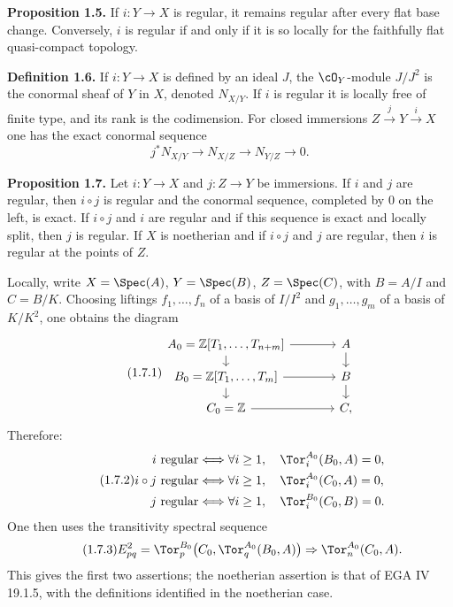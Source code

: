 \textbf{Proposition 1.5.} If \(i:Y\to X\) is regular, it remains regular after every flat base change. Conversely, \(i\) is regular if and only if it is so locally for the faithfully flat quasi-compact topology.

\textbf{Definition 1.6.} If \(i:Y\to X\) is defined by an ideal \(J\), the \(\cO_Y\)-module \(J/J^2\) is the conormal sheaf of \(Y\) in \(X\), denoted \(N_{X/Y}\). If \(i\) is regular it is locally free of finite type, and its rank is the codimension. For closed immersions \(Z\xrightarrow{j}Y\xrightarrow{i}X\) one has the exact conormal sequence
\begin{equation}\tag{1.6.1}
 j^*N_{X/Y}\longrightarrow N_{X/Z}\longrightarrow N_{Y/Z}\longrightarrow0.
\end{equation}

\textbf{Proposition 1.7.} Let \(i:Y\to X\) and \(j:Z\to Y\) be immersions. If \(i\) and \(j\) are regular, then \(i\circ j\) is regular and the conormal sequence, completed by \(0\) on the left, is exact. If \(i\circ j\) and \(i\) are regular and if this sequence is exact and locally split, then \(j\) is regular. If \(X\) is noetherian and if \(i\circ j\) and \(j\) are regular, then \(i\) is regular at the points of \(Z\).

Locally, write \(X=\Spec(A)\), \(Y=\Spec(B)\), \(Z=\Spec(C)\), with \(B=A/I\) and \(C=B/K\). Choosing liftings \(f_1,\ldots,f_n\) of a basis of \(I/I^2\) and \(g_1,\ldots,g_m\) of a basis of \(K/K^2\), one obtains the diagram
\begin{equation}\tag{1.7.1}
\begin{tikzcd}[column sep=large,row sep=small]
A_0=\mathbb Z[T_1,\ldots,T_{n+m}] \arrow[r] \arrow[d] & A \arrow[d]\\
B_0=\mathbb Z[T_1,\ldots,T_m] \arrow[r] \arrow[d] & B \arrow[d]\\
C_0=\mathbb Z \arrow[r] & C,
\end{tikzcd}
\end{equation}
Therefore:
\begin{equation}\tag{1.7.2}
\begin{aligned}
 i\ \text{regular} &\Longleftrightarrow \forall i\ge1,\quad
 \Tor_i^{A_0}(B_0,A)=0,\\
 i\circ j\ \text{regular} &\Longleftrightarrow \forall i\ge1,\quad
 \Tor_i^{A_0}(C_0,A)=0,\\
 j\ \text{regular} &\Longleftrightarrow \forall i\ge1,\quad
 \Tor_i^{B_0}(C_0,B)=0.
\end{aligned}
\end{equation}
One then uses the transitivity spectral sequence
\begin{equation}\tag{1.7.3}
E^2_{pq}=\Tor_p^{B_0}\bigl(C_0,\Tor_q^{A_0}(B_0,A)\bigr)\Rightarrow\Tor_n^{A_0}(C_0,A).
\end{equation}
This gives the first two assertions; the noetherian assertion is that of EGA IV 19.1.5, with the definitions identified in the noetherian case.

